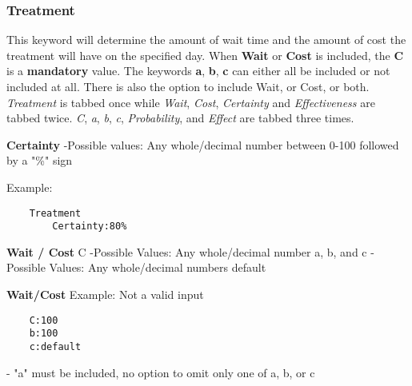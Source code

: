 \documentclass{article}
\begin{document}

\subsubsection{Treatment}
This keyword will determine the amount of wait time and the amount of cost the treatment will have on the specified day. When \textbf{Wait} or \textbf{Cost} is included, the \textbf{C} is a \textbf{mandatory} value. The keywords \textbf{a}, \textbf{b}, \textbf{c} can either all be included or not included at all. There is also the option to include Wait, or Cost, or both.
\newline \textit{Treatment} is tabbed once while \textit{Wait}, \textit{Cost}, \textit{Certainty} and \textit{Effectiveness} are tabbed twice. \textit{C}, \textit{a}, \textit{b}, \textit{c}, \textit{Probability}, and \textit{Effect} are tabbed three times.\newline


\noindent \textbf{Certainty} \newline
\indent-Possible values:\newline
\indent\indent Any whole/decimal number between 0-100 followed by a "\%" sign \newline

\noindent Example: 
\begin{lstlisting}
    Treatment
        Certainty:80%
\end{lstlisting}


\noindent \textbf{Wait / Cost} \newline
\noindent C \newline
\indent -Possible Values:\newline
\indent\indent Any whole/decimal number\newline
\noindent a, b, and c\newline
\indent -Possible Values:\newline
\indent\indent Any whole/decimal numbers\newline
\indent\indent default\newline

\noindent \textbf{Wait/Cost} \newline
\noindent Example: Not a valid input
\begin{lstlisting}
    C:100
    b:100
    c:default
\end{lstlisting}
- "a" must be included, no option to omit only one of a, b, or c\newline
\end{document}
